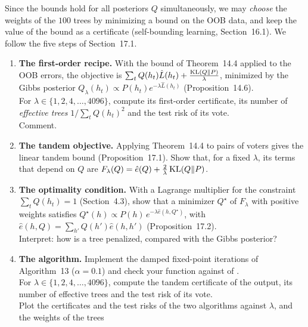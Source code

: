 \documentclass[a4paper,11pt]{article}
\begin{document}
\label{p5:learn}

Since the bounds hold for all posteriors $Q$ simultaneously, we may \emph{choose} the weights of the $100$ trees by
minimizing a bound on the OOB data, and keep the value of the bound as a certificate (self-bounding learning,
Section~16.1). We follow the five steps of Section~17.1.

\begin{enumerate}
\item \textbf{The first-order recipe.} With the bound of Theorem~14.4 applied to the OOB errors, the objective is
      $\sum_tQ(h_t)\hat L(h_t)+\frac{\operatorname{KL}(Q\|P)}{\lambda}$, minimized by the Gibbs posterior
      $Q_\lambda(h_t)\propto P(h_t)e^{-\lambda\hat L(h_t)}$ (Proposition~14.6).\\
      For $\lambda\in\{1,2,4,\dots,4096\}$, compute its first-order certificate, its number of \emph{effective trees}
      $1/\sum_tQ(h_t)^2$ and the test risk of its vote.\\
      Comment.
\item \textbf{The tandem objective.} Applying Theorem~14.4 to pairs of voters gives the linear tandem bound
      (Proposition~17.1). Show that, for a fixed $\lambda$, its terms that depend on $Q$ are
      $F_\lambda(Q)=\hat e(Q)+\frac2\lambda\operatorname{KL}(Q\|P)$.
\item \textbf{The optimality condition.} With a Lagrange multiplier for the constraint $\sum_tQ(h_t)=1$
      (Section~4.3), show that a minimizer $Q^\star$ of $F_\lambda$ with positive weights satisfies
      $Q^\star(h)\propto P(h)\,e^{-\lambda\hat e(h,Q^\star)}$, with $\hat e(h,Q)=\sum_{h'}Q(h')\hat e(h,h')$
      (Proposition~17.2).\\
      Interpret: how is a tree penalized, compared with the Gibbs posterior?
\item \textbf{The algorithm.} Implement the damped fixed-point iterations of Algorithm~13 ($\alpha=0.1$) and check your
      function against  of .\\
      For $\lambda\in\{1,2,4,\dots,4096\}$, compute the tandem certificate of the output, its number of effective trees and
      the test risk of its vote.\\
      Plot the certificates and the test risks of the two algorithms against $\lambda$, and the weights of the trees

\end{enumerate}
\end{document}
